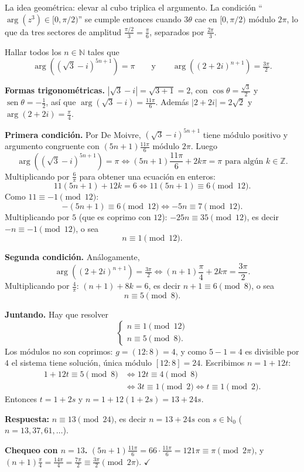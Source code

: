 \begin{nota}
La idea geométrica: elevar al cubo triplica el argumento. La condición
``$\arg(z^3)\in[0,\pi/2)$'' se cumple entonces cuando $3\theta$ cae en $[0,\pi/2)$
módulo $2\pi$, lo que da tres sectores de amplitud $\frac{\pi/2}{3}=\frac{\pi}{6}$,
separados por $\frac{2\pi}{3}$.
\end{nota}

\begin{ejemplo}
Hallar todos los $n\in\mathbb{N}$ tales que
\[
\arg\left((\sqrt{3}-i)^{5n+1}\right)=\pi
\qquad\text{y}\qquad
\arg\left((2+2i)^{n+1}\right)=\tfrac{3\pi}{2}.
\]

\textbf{Formas trigonométricas.} $|\sqrt{3}-i|=\sqrt{3+1}=2$, con
$\cos\theta=\frac{\sqrt{3}}{2}$ y $\operatorname{sen}\theta=-\frac12$, así que
$\arg(\sqrt{3}-i)=\frac{11\pi}{6}$. Además $|2+2i|=2\sqrt{2}$ y
$\arg(2+2i)=\frac{\pi}{4}$.

\textbf{Primera condición.} Por De Moivre, $(\sqrt{3}-i)^{5n+1}$ tiene módulo
positivo y argumento congruente con $(5n+1)\frac{11\pi}{6}$ módulo $2\pi$. Luego
\[
\arg\left((\sqrt{3}-i)^{5n+1}\right)=\pi
\iff (5n+1)\frac{11\pi}{6}+2k\pi=\pi \text{ para algún } k\in\mathbb{Z}.
\]
Multiplicando por $\frac{6}{\pi}$ para obtener una ecuación en enteros:
\[
11(5n+1)+12k=6 \iff 11(5n+1)\equiv 6 \pmod{12}.
\]
Como $11\equiv-1 \pmod{12}$:
\[
-(5n+1)\equiv 6 \pmod{12}\iff -5n\equiv 7 \pmod{12}.
\]
Multiplicando por $5$ (que es coprimo con $12$): $-25n\equiv 35 \pmod{12}$, es decir
$-n\equiv -1 \pmod{12}$, o sea
\[
n\equiv 1 \pmod{12}.
\]

\textbf{Segunda condición.} Análogamente,
\[
\arg\left((2+2i)^{n+1}\right)=\tfrac{3\pi}{2}
\iff (n+1)\frac{\pi}{4}+2k\pi=\frac{3\pi}{2}.
\]
Multiplicando por $\frac{4}{\pi}$: $(n+1)+8k=6$, es decir $n+1\equiv 6 \pmod 8$, o sea
\[
n\equiv 5 \pmod 8.
\]

\textbf{Juntando.} Hay que resolver
\[
\begin{cases}
n\equiv 1 \pmod{12}\\
n\equiv 5 \pmod 8.
\end{cases}
\]
Los módulos no son coprimos: $g=(12:8)=4$, y como $5-1=4$ es divisible por $4$ el
sistema tiene solución, única módulo $[12:8]=24$. Escribimos $n=1+12t$:
\begin{align*}
1+12t\equiv 5 \pmod 8 &\iff 12t\equiv 4 \pmod 8\\
&\iff 3t\equiv 1 \pmod 2 \iff t\equiv 1 \pmod 2.
\end{align*}
Entonces $t=1+2s$ y $n=1+12(1+2s)=13+24s$.

\textbf{Respuesta:} $n\equiv 13 \pmod{24}$, es decir $n=13+24s$ con $s\in\mathbb{N}_0$
($n=13,37,61,\dots$).

\textbf{Chequeo con $n=13$.} $(5n+1)\frac{11\pi}{6}=66\cdot\frac{11\pi}{6}=121\pi\equiv\pi \pmod{2\pi}$,
y $(n+1)\frac{\pi}{4}=\frac{14\pi}{4}=\frac{7\pi}{2}\equiv\frac{3\pi}{2} \pmod{2\pi}$. $\checkmark$
\end{ejemplo}

